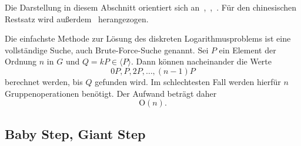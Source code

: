 Die Darstellung in diesem Abschnitt orientiert sich an~\cite[S.~146--153]{washington08},~\cite[S.~256]{guneysu24},~\cite[S.~76--78, 114--116]{werner02}.
Für den chinesischen Restsatz wird außerdem~\cite[S.~90, Satz~6.8]{karpf24} herangezogen.

Die einfachste Methode zur Lösung des diskreten Logarithmusproblems ist eine vollständige Suche, auch Brute-Force-Suche genannt. Sei $P$ ein Element der Ordnung $n$ in $G$ und $Q=kP\in\langle P\rangle$. Dann können nacheinander die Werte
\[
    0P,P,2P,\dots,(n-1)P
\]
berechnet werden, bis $Q$ gefunden wird. Im schlechtesten Fall werden
hierfür $n$ Gruppenoperationen benötigt. Der Aufwand beträgt daher
\[
    \mathrm{O}(n).
\]

\subsection{Baby Step, Giant Step}~\label{baby-step-giant-step}

